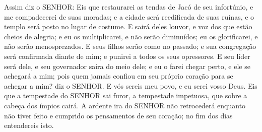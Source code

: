 {Assim diz o SENHOR: Eis que restaurarei as tendas de Jacó de seu infortúnio, e me compadecerei de suas moradas; e a cidade será reedificada de suas ruínas, e o templo será posto no lugar de costume.
E sairá deles louvor, e voz dos que estão cheios de alegria; e eu os multiplicarei, e não serão diminuídos; eu os glorificarei, e não serão menosprezados.
E seus filhos serão como no passado; e sua congregação será confirmada diante de mim; e punirei a todos os seus opressores.
E seu líder será dele, e seu governador saíra do meio dele; e eu o farei chegar perto, e ele se achegará a mim; pois quem jamais confiou em seu próprio coração para se achegar a mim? diz o SENHOR.
E vós sereis meu povo, e eu serei vosso Deus.
Eis que a tempestade do SENHOR sai
{} furor, a tempestade impetuosa, que sobre a cabeça dos ímpios cairá.
A ardente ira do SENHOR não retrocederá enquanto não tiver feito e cumprido os pensamentos de seu coração; no fim dos dias entendereis isto.

\par }

